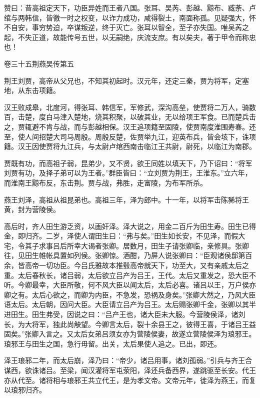 \documentclass[12pt,UTF8]{ctexbook}
\begin{document}
赞曰：昔高祖定天下，功臣异姓而王者八国。张耳、吴芮、彭越、黥布、臧荼、卢绾与两韩信，皆徼一时之权变，以诈力成功，咸得裂土，南面称孤。见疑强大，怀不自安，事穷势迫，卒谋叛逆，终于灭亡。张耳以智全，至子亦失国。唯吴芮之起，不失正道，故能传号五世，以无嗣绝，庆流支庶。有以矣夫，著于甲令而称忠也！





卷三十五荆燕吴传第五



荆王刘贾，高帝从父兄也，不知其初起时。汉元年，还定三秦，贾为将军，定塞地，从东击项籍。



汉王败成皋，北度河，得张耳、韩信军，军修武，深沟高垒，使贾将二万人，骑数百，击楚，度白马津入楚地，烧其积聚，以破其业，无以给项王军食。已而楚兵击之，贾辄避不肯与战，而与彭越相保。汉王追项籍至固陵，使贾南度淮围寿春。还至，使人间招楚大司马周殷。周殷反楚，佐贾举九江，迎英布兵，皆会垓下，诛项籍。汉王因使贾将九江兵，与太尉卢绾西南击临江王共尉，尉死，以临江为南郡。



贾既有功，而高祖子弱，昆弟少，又不贤，欲王同姓以填天下，乃下诏曰：“将军刘贾有功，及择子弟可以为王者。”群臣皆曰：“立刘贾为荆王，王淮东。”立六年，而淮南王黥布反，东击荆。贾与战，弗胜，走富陵，为布军所杀。



燕王刘泽，高祖从祖昆弟也。高祖三年，泽为郎中。十一年，以将军击陈豨将王黄，封为营陵侯。



高后时，齐人田生游乏资，以画奸泽。泽大说之，用金二百斤为田生寿。田生已得金，即归齐。二岁，泽使人谓田生曰：“弗与矣。”田生如长安，不见泽，而假大宅，令其子求事吕后所幸大谒者张卿。居数月，田生子请张卿临，亲修具。张卿往，见田生帷帐具置如列侯。张卿惊。酒酣，乃屏人说张卿曰：“臣观诸侯邸第百余，皆高帝一切功臣。今吕氏雅故本推毂高帝就天下，功至大，又有亲戚太后之重。太后春秋长，诸吕弱，太后欲立吕产为吕王，王代。太后又重发之，恐大臣不听。今卿最幸，大臣所敬，何不风大臣以闻太后，太后必喜。诸吕以王，万户侯亦卿之有。太后心欲之，而卿为内臣，不急发，恐祸及身矣。”张卿大然之，乃风大臣语太后。太后朝，因问大臣。大臣请立吕产为吕王。太后赐张卿千金，张卿以其半进田生。田生弗受，因说之曰：“吕产王也，诸大臣未大服。今营陵侯泽，诸刘长，为大将军，独此尚觖望。今卿言太后，裂十余县王之，彼得王喜，于诸吕王益固矣。”张卿入言之。又太后女弟吕须女亦为营陵侯妻，故遂立营陵侯泽为琅邪王。琅邪王与田生之国，急行毋留。出关，太后果使人追之。已出，即还。



泽王琅邪二年，而太后崩，泽乃曰：“帝少，诸吕用事，诸刘孤弱。”引兵与齐王合谋西，欲诛诸吕。至梁，闻汉灌将军屯荥阳，泽还兵备西界，遂跳驱至长安。代王亦从代至。诸将相与琅邪王共立代王，是为孝文帝。文帝元年，徙泽为燕王，而复以琅邪归齐。
\end{document}
